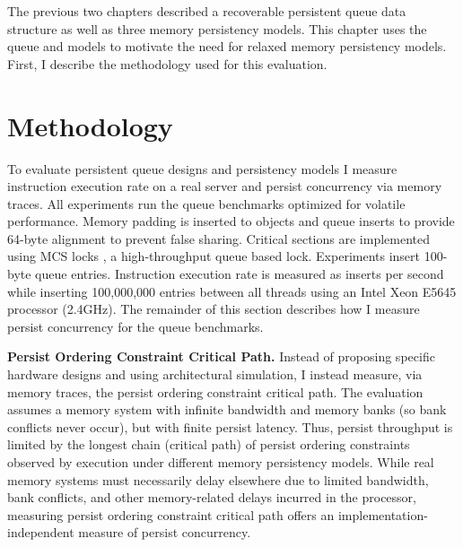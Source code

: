 The previous two chapters described a recoverable persistent queue data structure as well as three memory persistency models.
This chapter uses the queue and models to motivate the need for relaxed memory persistency models.
First, I describe the methodology used for this evaluation.

\section{Methodology}
\label{sec:PersistencyEval:Methodology}

To evaluate persistent queue designs and persistency models I measure instruction execution rate on a real server and persist concurrency via memory traces.
All experiments run the queue benchmarks optimized for volatile performance.
Memory padding is inserted to objects and queue inserts to provide 64-byte alignment to prevent false sharing.
Critical sections are implemented using MCS locks \cite{Mellor-Crummey91}, a high-throughput queue based lock.
Experiments insert 100-byte queue entries.
Instruction execution rate is measured as inserts per second while inserting 100,000,000 entries between all threads using an Intel Xeon E5645 processor (2.4GHz).
The remainder of this section describes how I measure persist concurrency for the queue benchmarks.

\textbf{Persist Ordering Constraint Critical Path.}
Instead of proposing specific hardware designs and using architectural simulation, I instead measure, via memory traces, the persist ordering constraint critical path.
The evaluation assumes a memory system with infinite bandwidth and memory banks (so bank conflicts never occur), but with finite persist latency.
Thus, persist throughput is limited by the longest chain (critical path) of persist ordering constraints observed by execution under different memory persistency models.
While real memory systems must necessarily delay elsewhere due to limited bandwidth, bank conflicts, and other memory-related delays incurred in the processor, measuring persist ordering constraint critical path offers an implementation-independent measure of persist concurrency.

